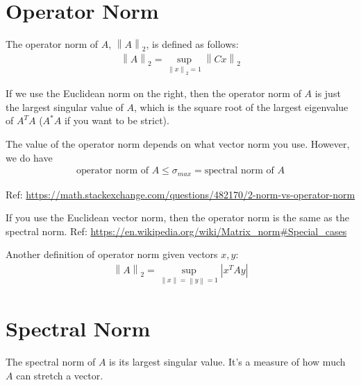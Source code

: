 \documentclass[11pt]{article}
\newcommand{\eq}[1]{\begin{align*}#1\end{align*}}
\newcommand{\norm}[1]{\left\lVert#1\right\rVert}
\begin{document}
\section{Operator Norm}
The operator norm of $A$, $\norm{A}_2$, is defined as follows:
\eq{
\norm{A}_2 = \sup_{\norm{x}_2=1} \norm{Cx}_2
}

If we use the Euclidean norm on the right, then the operator norm of $A$ is just the largest singular value of $A$, which is the square root of the largest eigenvalue of $A^T A$ ($A^* A$ if you want to be strict).

The value of the operator norm depends on what vector norm you use. However, we do have
\eq{
\text{operator norm of $A$} \leq \sigma_{max} = \text{spectral norm of $A$}
}

Ref: \url{https://math.stackexchange.com/questions/482170/2-norm-vs-operator-norm}

If you use the Euclidean vector norm, then the operator norm is the same as the spectral norm. Ref: \url{https://en.wikipedia.org/wiki/Matrix_norm#Special_cases}

Another definition of operator norm given vectors $x, y$:
\eq{
\norm{A}_2 = \sup_{\norm{x}=\norm{y}=1} |x^T A y|
}

\section{Spectral Norm}

The spectral norm of $A$ is its largest singular value. It's a measure of how much $A$ can stretch a vector.
\end{document}
